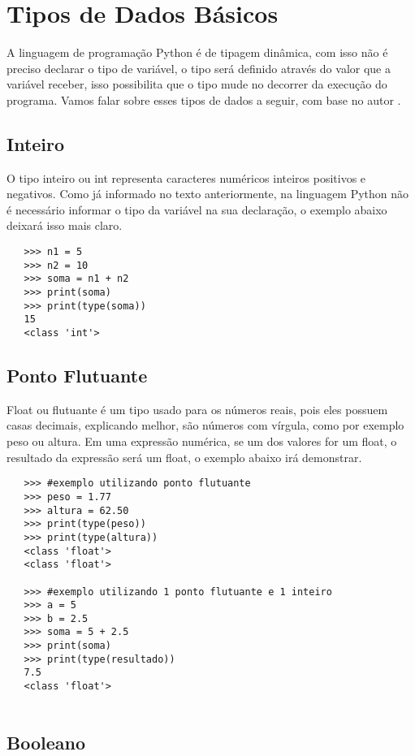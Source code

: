     \section{Tipos de Dados B\'{a}sicos}
	A linguagem de programação Python é de tipagem dinâmica, com isso não é preciso declarar o tipo de variável, o tipo será definido através do valor que a variável receber, isso possibilita que o tipo mude no decorrer da execução do programa. Vamos falar sobre esses tipos de dados a seguir, com base no autor \cite{Severance2016}.
	
			\subsection{Inteiro}
			O tipo inteiro ou int representa caracteres numéricos inteiros positivos e negativos. Como já informado no texto anteriormente, na linguagem Python não é necessário informar o tipo da variável na sua declaração, o exemplo abaixo deixará isso mais claro.
			\begin{lstlisting}
   >>> n1 = 5
   >>> n2 = 10
   >>> soma = n1 + n2
   >>> print(soma)	
   >>> print(type(soma))		
   15
   <class 'int'>
			\end{lstlisting}
		
			\subsection{Ponto Flutuante}
			Float ou flutuante é um tipo usado para os números reais, pois eles possuem casas decimais, explicando melhor, são números com vírgula, como por exemplo peso ou altura. Em uma expressão numérica, se um dos valores for um float, o resultado da expressão será um float, o exemplo abaixo irá demonstrar.
			\begin{lstlisting}
   >>> #exemplo utilizando ponto flutuante
   >>> peso = 1.77
   >>> altura = 62.50
   >>> print(type(peso))
   >>> print(type(altura))
   <class 'float'>
   <class 'float'>
   
   >>> #exemplo utilizando 1 ponto flutuante e 1 inteiro
   >>> a = 5
   >>> b = 2.5
   >>> soma = 5 + 2.5
   >>> print(soma)
   >>> print(type(resultado))
   7.5
   <class 'float'>
   
			\end{lstlisting}
		
			\subsection{Booleano}
			

